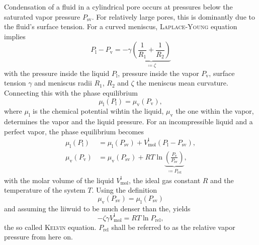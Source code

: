 \documentclass[../thesis.tex]{subfiles}
\begin{document}
      Condensation of a fluid in a cylindrical pore occurs at pressures below the saturated vapor pressure $P_\mathrm{sv}$. For relatively large pores, this is dominantly due to the fluid's surface tension. For a curved meniscus, \textsc{Laplace-Young} equation implies
      \begin{equation*}
        P_\mathrm{l}-P_\mathrm{v}=-\gamma\underbrace{\left(\frac{1}{R_1}+\frac{1}{R_2}\right)}_{\coloneqq\zeta}
      \end{equation*}
      with the pressure inside the liquid $P_\mathrm{l}$, pressure inside the vapor $P_\mathrm{v}$, surface tension $\gamma$ and meniscus radii $R_1$, $R_2$ and $\zeta$ the meniscus mean curvature.
      Connecting this with the phase equilibrium
      \begin{equation*}
        \mu_\mathrm{l}(P_\mathrm{l})=\mu_\mathrm{v}(P_\mathrm{v}),
      \end{equation*}
      where $\mu_\mathrm{l}$ is the chemical potential wihtin the liquid, $\mu_\mathrm{v}$ the one within the vapor, determines the vapor and the liquid pressure. For an incompressible liquid and a perfect vapor, the phase equilibrium becomes
      \begin{align*}
        \mu_\mathrm{l}(P_\mathrm{l}) &= \mu_\mathrm{l}(P_\mathrm{sv})+V_\mathrm{mol}^\mathrm{l}(P_\mathrm{l}-P_\mathrm{sv}),  \\
        \mu_\mathrm{v}(P_\mathrm{v}) &= \mu_\mathrm{v}(P_\mathrm{sv})+RT\ln\underbrace{\left( \frac{P_\mathrm{v}}{P_\mathrm{sv}}\right)}_{\coloneqq P_\mathrm{rel}},
      \end{align*}
      with the molar volume of the liquid $V_\mathrm{mol}^\mathrm{l}$, the ideal gas constant $R$ and the temperature of the system $T$. Using the definition
      \begin{equation*}
        \mu_\mathrm{v}(P_\mathrm{sv})=\mu_\mathrm{l}(P_\mathrm{sv})
      \end{equation*}
      and assuming the liiwuid to be much denser than the, yields
      \begin{equation}
        -\zeta\gamma V_\mathrm{mol}^\mathrm{l}= RT\ln P_\mathrm{rel},
      \end{equation}
      the so called \textsc{Kelvin} equation. $P_\mathrm{rel}$ shall be referred to as the relative vapor pressure from here on.
      \medskip

      
\end{document}
